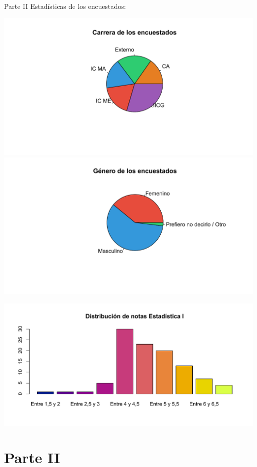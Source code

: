 \documentclass[pdf]{beamer}
\begin{document}
\begin{frame}{Parte II}
Estadísticas de los encuestados:


\includegraphics[trim={1.5cm 0.5cm 1cm 0},width=0.45\linewidth,scale=1]{carreras.pdf}
\includegraphics[trim={1.5cm 0.5cm 1cm 0},width=0.45\linewidth,scale=1]{sexo.pdf}

\includegraphics[trim={0.25cm 1cm 0.25cm 1cm},width=\linewidth]{estadistica1_2.pdf}
\section{Parte II}

\end{frame}
\end{document}
